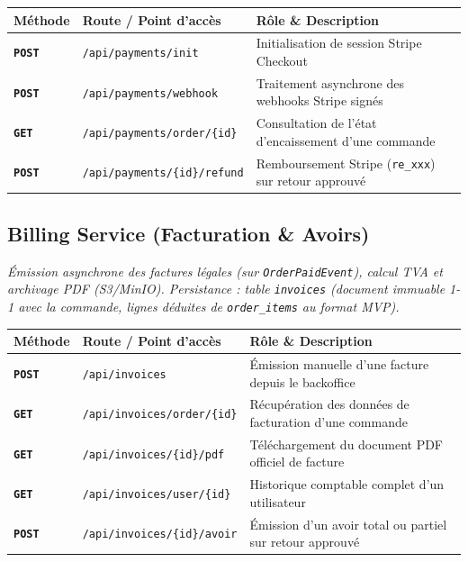 \documentclass[10pt,a4paper]{article}
\begin{document}
\begin{center}
\renewcommand{\arraystretch}{1.08}
\begin{tabularx}{\textwidth}{@{} l p{6.8cm} >{\raggedright\arraybackslash}X @{}}
\toprule[0.8pt]
\rowcolor{hdrcolor}
\textbf{Méthode} & \textbf{Route / Point d'accès} & \textbf{Rôle \& Description} \\
\midrule
\textcolor{postgreen}{\texttt{\textbf{POST}}} & \texttt{/api/payments/init} & Initialisation de session Stripe Checkout \\
\textcolor{postgreen}{\texttt{\textbf{POST}}} & \texttt{/api/payments/webhook} & Traitement asynchrone des webhooks Stripe signés \\
\textcolor{syncblue}{\texttt{\textbf{GET}}}  & \texttt{/api/payments/order/\{id\}} & Consultation de l'état d'encaissement d'une commande \\
\textcolor{postgreen}{\texttt{\textbf{POST}}} & \texttt{/api/payments/\{id\}/refund} & Remboursement Stripe (\texttt{re\_xxx}) sur retour approuvé \\
\bottomrule[0.8pt]
\end{tabularx}
\end{center}

\vspace{3pt}

\subsection{Billing Service (Facturation \& Avoirs)}
\textit{Émission asynchrone des factures légales (sur \texttt{OrderPaidEvent}), calcul TVA et archivage PDF (S3/MinIO). Persistance : table \texttt{invoices} (document immuable 1-1 avec la commande, lignes déduites de \texttt{order\_items} au format MVP).}

\begin{center}
\renewcommand{\arraystretch}{1.08}
\begin{tabularx}{\textwidth}{@{} l p{6.8cm} >{\raggedright\arraybackslash}X @{}}
\toprule[0.8pt]
\rowcolor{hdrcolor}
\textbf{Méthode} & \textbf{Route / Point d'accès} & \textbf{Rôle \& Description} \\
\midrule
\textcolor{postgreen}{\texttt{\textbf{POST}}} & \texttt{/api/invoices} & Émission manuelle d'une facture depuis le backoffice \\
\textcolor{syncblue}{\texttt{\textbf{GET}}} & \texttt{/api/invoices/order/\{id\}} & Récupération des données de facturation d'une commande \\
\textcolor{syncblue}{\texttt{\textbf{GET}}} & \texttt{/api/invoices/\{id\}/pdf} & Téléchargement du document PDF officiel de facture \\
\textcolor{syncblue}{\texttt{\textbf{GET}}} & \texttt{/api/invoices/user/\{id\}} & Historique comptable complet d'un utilisateur \\
\textcolor{postgreen}{\texttt{\textbf{POST}}} & \texttt{/api/invoices/\{id\}/avoir} & Émission d'un avoir total ou partiel sur retour approuvé \\
\bottomrule[0.8pt]
\end{tabularx}
\end{center}
\end{document}
